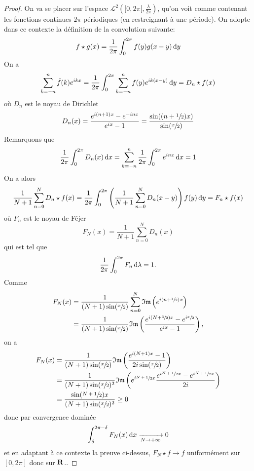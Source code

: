 \begin{proof}
    On va se placer sur l'espace $\mathcal  L^2([0,2\pi[, \frac\lambda{2\pi})$, qu'on voit comme contenant les fonctions continues $2\pi$-périodiques (en restreignant à une période). On adopte dans ce contexte la définition de la convolution suivante: \[
        f\star g(x)= \frac{1}{2\pi}\int_0^{2\pi}f(y)g(x-y)\mathop{}\!\mathrm d y
    \] 
    On a \[
        \sum_{k=-n}^n \hat{f}(k)e^{ikx} = \frac{1}{2\pi}\int_0^{2\pi} \sum_{k=-n}^n f(y)e^{ik(x-y)}\mathop{}\!\mathrm d y=D_n\star f(x)
    \]
    où $D_n$ est le noyau de Dirichlet \[
        D_n(x)= \frac{e^{i(n+1)x}-e^{-inx}}{e^{ix}-1}= \frac{\sin((n+\sfrac12)x)}{\sin(\sfrac x2)}
    \] 
    Remarquons que \[
        \frac{1}{2\pi}\int_0^{2\pi} D_n(x)\mathop{}\!\mathrm d x=\sum_{k=-n}^n\frac{1}{2\pi}\int_0^{2\pi} e^{inx}\mathop{}\!\mathrm d x=1
    \]
    On a alors \[
        \frac{1}{N+1}\sum_{n=0}^N D_n\star f(x)=\frac{1}{2\pi}\int_0^{2\pi}\left(\frac{1}{N+1}\sum_{n=0}^ND_n(x-y)\right) f(y)\mathop{}\!\mathrm d y=F_n\star f(x)
    \] 
    où $F_n$ est le noyau de Féjer \[
        F_N(x)=\frac{1}{N+1}\sum_{n=0}^N D_n(x)
    \]
    qui est tel que \[
        \frac{1}{2\pi}\int_0^{2\pi}F_n\mathop{}\!\mathrm d \lambda=1.
    \] 
    Comme \begin{align*}
    F_N(x) &= \frac{1}{(N+1)\sin(\sfrac{x}{2})} \sum_{n=0}^{N} \mathfrak{Im}\left(e^{i(n+\sfrac12)x}\right)\\
&= \frac{1}{(N+1)\sin(\sfrac{x}{2})}\mathfrak{Im} \left( \frac{e^{i(N+\sfrac32)x}-e^{i\sfrac{x}{2}}}{e^{ix}-1}\right),
    \end{align*}
    on a 
    \begin{align*}
F_N(x) &= \frac{1}{(N+1)\sin(\sfrac{x}{2})}\mathfrak{Im} \left( \frac{e^{i(N+1)x}-1}{2i\sin(\sfrac{x}{2})}\right)\\
&= \frac{1}{(N+1)\sin(\sfrac{x}{2})^2}\mathfrak{Im} \left( e^{i \sfrac{N+1}{2}x}\frac{e^{i \sfrac{N+1}{2}x}-e^{i \sfrac{N+1}{2}x}}{2i}\right)\\
&= \frac{\sin(\sfrac{N+1}{2})x}{(N+1)\sin(\sfrac{x}{2})^2}\geq 0
\end{align*}
donc par convergence dominée \[
    \int_\delta^{2\pi-\delta} F_N(x)\mathop{}\!\mathrm d x \xrightarrow[N\to +\infty]{}0
\] 
et en adaptant à ce contexte la preuve ci-dessus, $F_N\star f \longrightarrow f$ uniformément sur $[0,2\pi]$ donc sur $\mathbf R$..
\end{proof}
